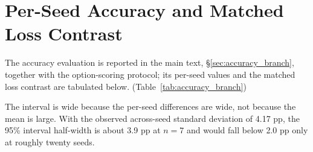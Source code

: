 \section{Per-Seed Accuracy and Matched Loss Contrast}
\label{app:accuracy_seeds}

The accuracy evaluation is reported in the main text, \S\ref{sec:accuracy_branch}, together with the option-scoring protocol; its per-seed values and the matched loss contrast are tabulated below. (Table~\ref{tab:accuracy_branch})

The interval is wide because the per-seed differences are wide, not because the mean is large. With the observed across-seed standard deviation of 4.17 pp, the 95\% interval half-width is about 3.9 pp at $n=7$ and would fall below 2.0 pp only at roughly twenty seeds. 


